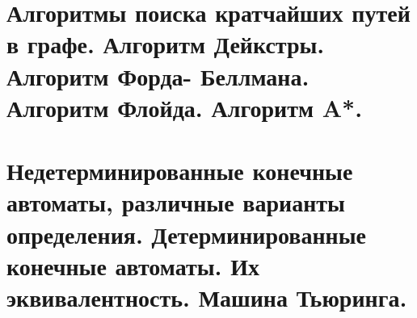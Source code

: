 \begin{multicols}{2}
    \section{Алгоритмы поиска кратчайших путей в графе. Алгоритм Дейкстры. Алгоритм Форда-
    Беллмана. Алгоритм Флойда. Алгоритм A*.}
    \columnbreak
    \section{Недетерминированные конечные автоматы, различные варианты определения.
    Детерминированные конечные автоматы. Их эквивалентность. Машина Тьюринга.}
\end{multicols}